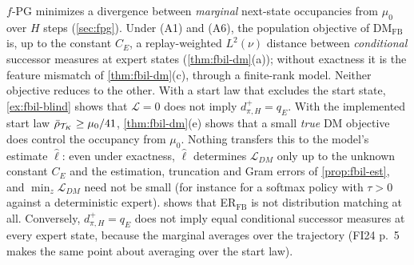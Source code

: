 \begin{remark}\label{rem:fbil-fpg}
$f$-PG minimizes a divergence between \emph{marginal} next-state occupancies from $\mu_0$ over $H$ steps (\cref{sec:fpg}).
Under (A1) and (A6), the population objective of DM$_{\mathrm{FB}}$ is, up to the constant $C_E$, a replay-weighted $L^2(\nu)$ distance between \emph{conditional} successor measures at expert states (\cref{thm:fbil-dm}(a)); without exactness it is the feature mismatch of \cref{thm:fbil-dm}(c), through a finite-rank model.
Neither objective reduces to the other.
With a start law that excludes the start state, \cref{ex:fbil-blind} shows that $\mathcal L=0$ does not imply $d^+_{\pi,H}=q_E$.
With the implemented start law $\bar\rho_{\mathcal T_K}\ge\mu_0/\vn{const.n_starts}{41}$, \cref{thm:fbil-dm}(e) shows that a small \emph{true} DM objective does control the occupancy from $\mu_0$. Nothing transfers this to the model's estimate $\hat\ell$: even under exactness, $\hat\ell$ determines $\mathcal L_{DM}$ only up to the unknown constant $C_E$ and the estimation, truncation and Gram errors of \cref{prop:fbil-est}, and $\min_z\mathcal L_{DM}$ need not be small (for instance for a softmax policy with $\tau>0$ against a deterministic expert).
 shows that ER$_{\mathrm{FB}}$ is not distribution matching at all.
Conversely, $d^+_{\pi,H}=q_E$ does not imply equal conditional successor measures at every expert state, because the marginal averages over the trajectory (FI24 p.~5 makes the same point about averaging over the start law).
\end{remark}
